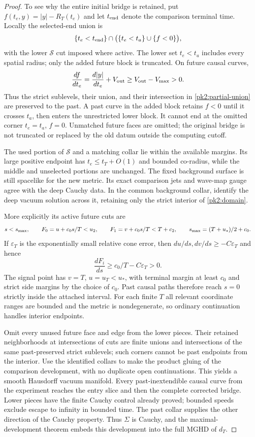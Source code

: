\begin{proof}
To see why the entire initial bridge is retained, put
$f(t_e,y)=|y|-R_T(t_e)$ and let $t_{\rm end}$ denote the comparison
terminal time. Locally the selected-end union is
\begin{equation}
 \{t_e<t_{\rm end}\}\cap
    \bigl(\{t_e<t_a\}\cup\{f<0\}\bigr),
 \label{pk2:partial-union}
\end{equation}
with the lower $\mathcal S$ cut imposed where active. The lower
set $t_e<t_a$ includes every spatial radius; only the added future
block is truncated. On future causal curves,
\[
 \frac{df}{dt_e}
   =\frac{d|y|}{dt_e}+V_{\rm out}
   \ge V_{\rm out}-V_{\rm max}>0.
\]
Thus the strict sublevels, their union, and their intersection
in \eqref{pk2:partial-union} are preserved to the past. A past
curve in the added block retains $f<0$ until it crosses $t_a$,
then enters the unrestricted lower block. It cannot end at the
omitted corner $t_e=t_a$, $f=0$. Unmatched future faces are omitted;
the original bridge is not truncated or replaced by the old datum
outside the computing cutoff.

The used portion of $\mathcal S$ and a matching collar lie within
the available margins. Its large positive endpoint has
$t_e\le t_T+O(1)$ and bounded co-radius, while the middle and
unselected portions are unchanged. The fixed background surface
is still spacelike for the new metric. Its exact comparison jets
and wave-map gauge agree with the deep Cauchy data. In the common
background collar, identify the deep vacuum solution across it,
retaining only the strict interior of \eqref{pk2:domain}.

More explicitly its active future cuts are
\[
 s<s_{\rm max},\qquad
 F_0=u+c_0s/T<u_2,\qquad
 F_1=v+c_0s/T<T+c_2,
 \qquad s_{\rm max}=(T+u_*)/2+c_0.
\]
If $\varepsilon_T$ is the exponentially small relative cone error,
then $du/ds,dv/ds\ge-C\varepsilon_T$ and hence
\[
 \frac{dF_i}{ds}\ge c_0/T-C\varepsilon_T>0.
\]
The signal point has $v=T$, $u=u_T<u_*$, with terminal margin
at least $c_0$ and strict side margins by the choice of $c_0$.
Past causal paths therefore reach $s=0$ strictly inside the
attached interval. For each finite $T$ all relevant coordinate
ranges are bounded and the metric is nondegenerate, so ordinary
continuation handles interior endpoints.

Omit every unused future face and edge from the lower pieces.
Their retained neighborhoods at intersections of cuts are finite
unions and intersections of the same past-preserved strict
sublevels; such corners cannot be past endpoints from the
interior. Use the identified collars to make the product gluing
of the comparison development, with no duplicate open
continuations. This yields a smooth Hausdorff vacuum manifold.
Every past-inextendible causal curve from the experiment reaches
the entry slice and then the complete corrected bridge. Lower
pieces have the finite Cauchy control already proved; bounded
speeds exclude escape to infinity in bounded time. The past
collar supplies the other direction of the Cauchy property.
Thus $\Sigma$ is Cauchy, and the maximal-development theorem
embeds this development into the full MGHD of $d_T$.


\end{proof}
